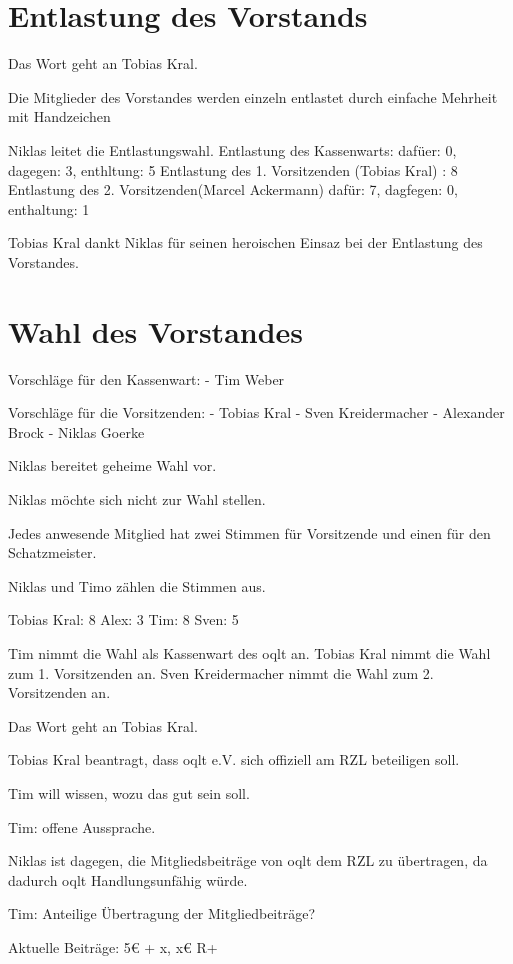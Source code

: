 \documentclass{scrartcl}
\begin{document}
\section{Entlastung des Vorstands}{

Das Wort geht an Tobias Kral.

Die Mitglieder des Vorstandes werden einzeln entlastet durch einfache Mehrheit mit Handzeichen

Niklas leitet die Entlastungswahl.
Entlastung des Kassenwarts: dafüer: 0, dagegen: 3, enthltung: 5
Entlastung des 1. Vorsitzenden (Tobias Kral) : 8 
Entlastung des 2. Vorsitzenden(Marcel Ackermann) dafür: 7, dagfegen: 0, enthaltung: 1

Tobias Kral dankt Niklas für seinen heroischen Einsaz bei der Entlastung des Vorstandes.

\section{Wahl des Vorstandes}

Vorschläge für den Kassenwart:
- Tim Weber

Vorschläge für die Vorsitzenden:
- Tobias Kral
- Sven Kreidermacher
- Alexander Brock
- Niklas Goerke

Niklas bereitet geheime Wahl vor.

Niklas möchte sich nicht zur Wahl stellen.

Jedes anwesende Mitglied hat zwei Stimmen für Vorsitzende und einen für den Schatzmeister.

Niklas und Timo zählen die Stimmen aus.

Tobias Kral: 8
Alex: 3
Tim:  8
Sven: 5

Tim nimmt die Wahl als Kassenwart des oqlt an.
Tobias Kral nimmt die Wahl zum 1. Vorsitzenden an.
Sven Kreidermacher nimmt die Wahl zum 2. Vorsitzenden an.

Das Wort geht an Tobias Kral.

Tobias Kral beantragt, dass oqlt e.V. sich offiziell am RZL beteiligen soll.

Tim will wissen, wozu das gut sein soll.

Tim: offene Aussprache.

Niklas ist dagegen, die Mitgliedsbeiträge von oqlt dem RZL zu übertragen,
da dadurch oqlt Handlungsunfähig würde.

Tim: Anteilige Übertragung der Mitgliedbeiträge?

Aktuelle Beiträge: 5€ + x, x€ R+

}
\end{document}
